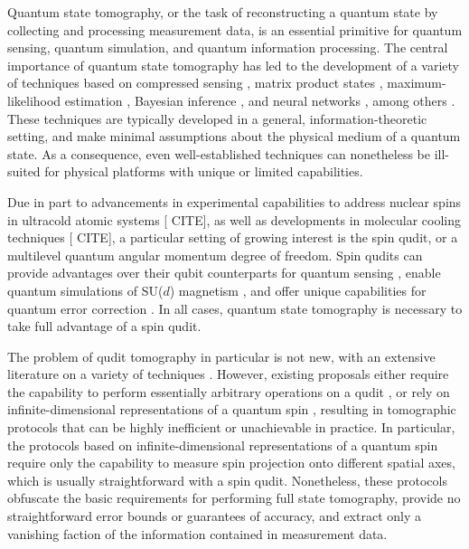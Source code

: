 \documentclass[notitlepage,twocolumn]{revtex4-2}
\newcommand{\red}[1]{{\color{red} #1}}
\begin{document}
Quantum state tomography, or the task of reconstructing a quantum state by collecting and processing measurement data, is an essential primitive for quantum sensing, quantum simulation, and quantum information processing.
The central importance of quantum state tomography has led to the development of a variety of techniques based on compressed sensing \cite{gross2010quantum}, matrix product states \cite{cramer2010efficient}, maximum-likelihood estimation \cite{smolin2012efficient}, Bayesian inference \cite{huszar2012adaptive}, and neural networks \cite{torlai2018neuralnetwork}, among others \cite{christandl2012reliable, qi2013quantum, opatrny1997leastsquares}.
These techniques are typically developed in a general, information-theoretic setting, and make minimal assumptions about the physical medium of a quantum state.
As a consequence, even well-established techniques can nonetheless be ill-suited for physical platforms with unique or limited capabilities.

Due in part to advancements in experimental capabilities to address nuclear spins in ultracold atomic systems [\red{CITE}], as well as developments in molecular cooling techniques [\red{CITE}], a particular setting of growing interest is the spin qudit, or a multilevel quantum angular momentum degree of freedom.
Spin qudits can provide advantages over their qubit counterparts for quantum sensing \cite{evrard2019enhanced}, enable quantum simulations of SU($d$) magnetism \cite{banerjee2013atomic, cazalilla2014ultracold, zhang2014spectroscopic, scazza2014observation, goban2018emergence}, and offer unique capabilities for quantum error correction \cite{albert2020robust, gross2020encoding}.
In all cases, quantum state tomography is necessary to take full advantage of a spin qudit.

The problem of qudit tomography in particular is not new, with an extensive literature on a variety of techniques \cite{manko1997spin, thew2002qudit, flammia2005minimal, salazar2012quantum, sosa-martinez2017quantum, ha2018minimal, evrard2019enhanced, stefano2019set, palici2020oam}.
However, existing proposals either require the capability to perform essentially arbitrary operations on a qudit \cite{thew2002qudit, flammia2005minimal, salazar2012quantum, sosa-martinez2017quantum, ha2018minimal, stefano2019set, palici2020oam}, or rely on infinite-dimensional representations of a quantum spin \cite{manko1997spin, evrard2019enhanced}, resulting in tomographic protocols that can be highly inefficient or unachievable in practice.
In particular, the protocols based on infinite-dimensional representations of a quantum spin require only the capability to measure spin projection onto different spatial axes, which is usually straightforward with a spin qudit.
Nonetheless, these protocols obfuscate the basic requirements for performing full state tomography, provide no straightforward error bounds or guarantees of accuracy, and extract only a vanishing faction of the information contained in measurement data.
\end{document}
